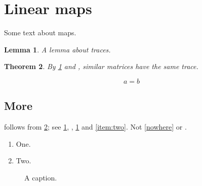 \documentclass{article}
\newtheorem{theorem}{Theorem}[section]
\newtheorem{lemma}[theorem]{Lemma}
\begin{document}
\section{Linear maps}\label{sec:maps}
Some text about maps.
\begin{lemma}\label{lem:cyclic}
A lemma about traces.
\end{lemma}
\begin{theorem}\label{thm:similar}
By \cref{lem:cyclic} and , similar matrices have the same trace.
\end{theorem}
\begin{equation}\label{eq:main}
a = b
\end{equation}
\subsection{More}\label{sec:more}
 follows from \cref{thm:similar}; see \cref{sec:maps}, , \cref{fig:one} and \cref{item:two}. Not \cref{nowhere} or .
\begin{enumerate}
\item One.
\item Two.\label{item:two}
\end{enumerate}
\begin{figure}[h]
\centering
\caption{A caption.}\label{fig:one}
\end{figure}
\end{document}
